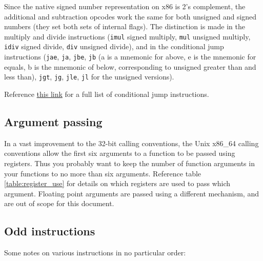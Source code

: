 \documentclass[11pt]{article}
\begin{document}
Since the native signed number representation on x86 is 2's complement, the additional and
subtraction opcodes work the same for both unsigned and signed numbers (they set both sets
of internal flags). The distinction is made in the multiply and divide instructions
(\texttt{imul} signed multiply, \texttt{mul} unsigned multiply, \texttt{idiv} signed
divide, \texttt{div} unsigned divide), and in the conditional jump instructions
(\texttt{jae}, \texttt{ja}, \texttt{jbe}, \texttt{jb} (a is a mnemonic for above, e is the
mnemonic for equals, b is the mnemonic of below, corresponding to unsigned greater than
and less than), \texttt{jgt}, \texttt{jg}, \texttt{jle}, \texttt{jl} for the unsigned
versions).

Reference \href{https://www.felixcloutier.com/x86/jcc}{this link} for a full list of
conditional jump instructions.

\subsection{Argument passing}

In a vast improvement to the 32-bit calling conventions, the Unix x86\_64 calling
conventions allow the first six arguments to a function to be passed using registers. Thus
you probably want to keep the number of function arguments in your functions to no more
than six arguments. Reference table \ref{table:register_use} for details on which
registers are used to pass which argument. Floating point arguments are passed using a
different mechanism, and are out of scope for this document.

\subsection{Odd instructions}

Some notes on various instructions in no particular order:
\end{document}
